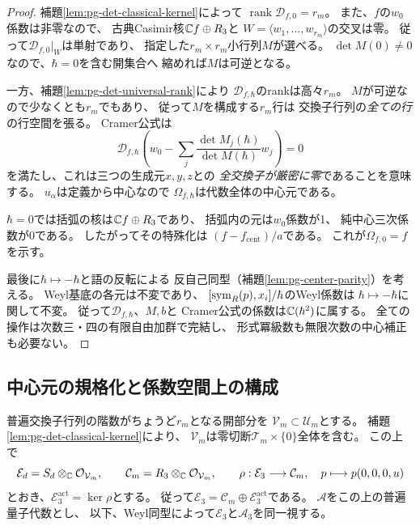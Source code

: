 \begin{proof}
補題\ref{lem:pg-det-classical-kernel}によって
$\operatorname{rank}\mathcal D_{f,0}=r_m$。
また、$f$の$w_0$係数は非零なので、
古典Casimir核$\mathbb C f\oplus R_3$と
$W=\langle w_1,\ldots,w_{r_m}\rangle$の交叉は零。
従って$\mathcal D_{f,0}|_W$は単射であり、
指定した$r_m\times r_m$小行列$M$が選べる。
$\det M(0)\ne0$なので、$\hbar=0$を含む開集合へ
縮めれば$M$は可逆となる。

一方、補題\ref{lem:pg-det-universal-rank}により
$\mathcal D_{f,\hbar}$のrankは高々$r_m$。
$M$が可逆なので少なくとも$r_m$でもあり、
従って$M$を構成する$r_m$行は
交換子行列の\emph{全ての行}の行空間を張る。
Cramer公式は
\begin{equation}
 \mathcal D_{f,\hbar}
 \left(w_0-\sum_j\frac{\det M_j(\hbar)}{\det M(\hbar)}w_j\right)=0
 \label{eq:pg-det-cramer-kernel}
\end{equation}
を満たし、これは三つの生成元$x,y,z$との
\emph{全交換子が厳密に零}であることを意味する。
$u_\alpha$は定義から中心なので
$\Omega_{f,\hbar}$は代数全体の中心元である。

$\hbar=0$では括弧の核は$\mathbb C f\oplus R_3$であり、
括弧内の元は$w_0$係数が1、
純中心三次係数が0である。
したがってその特殊化は
$(f-f_{\mathrm{cent}})/a$である。
これが$\Omega_{f,0}=f$を示す。

最後に$\hbar\mapsto-\hbar$と語の反転による
反自己同型（補題\ref{lem:pg-center-parity}）を考える。
Weyl基底の各元は不変であり、
$[\operatorname{sym}_R(p),x_i]/\hbar$のWeyl係数は
$\hbar\mapsto-\hbar$に関して不変。
従って$\mathcal D_{f,\hbar}$、$M,b$と
Cramer公式の係数は$\mathbb C(\hbar^2)$に属する。
全ての操作は次数三・四の有限自由加群で完結し、
形式冪級数も無限次数の中心補正も必要ない。
\end{proof}

\subsection{中心元の規格化と係数空間上の構成}
\label{subsec:pg-det-center-family}
普遍交換子行列の階数がちょうど$r_m$となる開部分を
$\mathcal V_m\subset\mathcal U_m$とする。
補題\ref{lem:pg-det-classical-kernel}により、
$\mathcal V_m$は零切断$\mathcal T_m\times\{0\}$全体を含む。
この上で
\begin{equation}
 \mathcal E_d=S_d\otimes_\mathbb C\mathcal O_{\mathcal V_m},\qquad
 \mathcal C_m=R_3\otimes_\mathbb C\mathcal O_{\mathcal V_m},\qquad
 \rho:\mathcal E_3\longrightarrow\mathcal C_m,
 \quad p\longmapsto p(0,0,0,u)
 \label{eq:pg-det-degree-three-bundles}
\end{equation}
とおき、$\mathcal E_3^{\mathrm{act}}=\ker\rho$とする。
従って$\mathcal E_3=\mathcal C_m\oplus\mathcal E_3^{\mathrm{act}}$である。
$\mathcal A$をこの上の普遍量子代数とし、
以下、Weyl同型によって$\mathcal E_3$と$\mathcal A_3$を同一視する。

